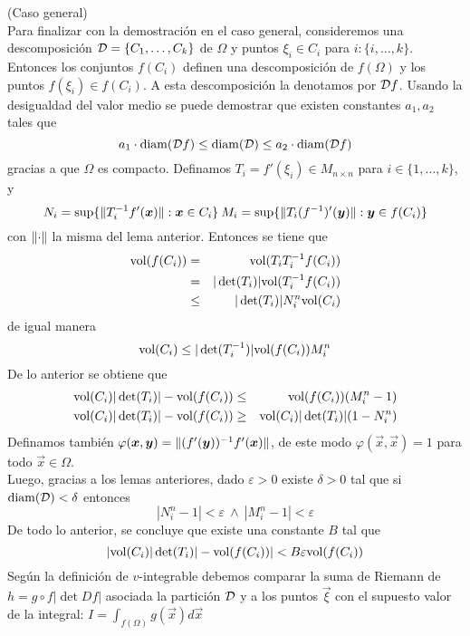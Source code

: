 \begin{demostracion} \hspace{2mm} (Caso general)
\\Para finalizar con la demostraci\'on en el caso general,
consideremos una descomposici\'on ${\cal D} =\{C_1,\ldots,C_k\}$ de
$\Omega$ y puntos $\xi_i\in C_i$ para $i:\{i,\ldots,k\}$. Entonces los
conjuntos $f(C_i)$ definen una descomposici\'on de $f(\Omega )$ y
los puntos $f(\xi_i)\in f(C_i)$. A esta descomposici\'on la
denotamos por ${\cal D} f$. Usando la desigualdad del valor medio se
puede demostrar que existen constantes $a_1,a_2$ tales que
\[a_1\cdot {\rm diam} ({\cal D} f)\leq {\rm diam} ({\cal D})\leq a_2\cdot {\rm
diam}({\cal D}
f)\] gracias a que $\Omega$ es compacto. Definamos
$T_i=f'(\xi_i)\in M_{n\times n}$ para $i\in\{1,\ldots,k\}$, y
\[N_i=\sup\{\lVert T_i^{-1}f'(\boldsymbol{x})\rVert : \boldsymbol{x}\in C_i\}\: M_i=\sup\{\lVert T_i(f^{-1})'(\boldsymbol{y})\rVert : \boldsymbol{y}\in f(C_i)\}\]
con $\lVert\cdot\rVert$ la misma del lema anterior. Entonces se tiene
que
\begin{eqnarray*}
{\rm vol}(f(C_i)) &=& {\rm vol}(T_i T_i^{-1}f(C_i))\\ &=& |\det
(T_i)|{\rm vol} (T_i^{-1}f(C_i))\\ &\leq & |\det (T_i)|N_i^n {\rm
vol} (C_i)
\end{eqnarray*}
de igual manera
\[{\rm vol} (C_i)\leq |\det (T_i^{-1})|{\rm vol} (f(C_i))M_i^n\]
De lo anterior se obtiene que
\begin{eqnarray*}
{\rm vol}(C_i)|\det(T_i)|-{\rm vol}(f(C_i)) &\leq& {\rm
vol}(f(C_i))(M_i^n-1)\\ {\rm vol}(C_i)|\det(T_i)|-{\rm
vol}(f(C_i))&\geq& {\rm vol}(C_i)|\det(T_i)|(1-N_i^n)
\end{eqnarray*}
Definamos tambi\'en $\varphi(\boldsymbol{x},\boldsymbol{y})=\lVert(f'(\boldsymbol{y}))^{-1}f'(\boldsymbol{x})\rVert$, de
este modo $\varphi(\vec{x},\vec{x})=1$ para todo $\vec{x}\in \Omega$.\\ Luego,
gracias a los lemas anteriores, dado $\varepsilon
>0$ existe $\delta >0$ tal que si ${\rm diam}({\cal D})<\delta$
entonces
\[|N_i^n-1|<\varepsilon\:\wedge\:|M_i^n-1|<\varepsilon\]
De todo lo anterior, se concluye que existe una constante $B$ tal
que
\[|{\rm vol}(C_i)|\det (T_i)|-{\rm vol}(f(C_i))|<B\varepsilon {\rm vol}(f(C_i))\]
Seg\'un la definici\'on de $v$-integrable debemos comparar la suma
de Riemann de $h=g\circ f|\det Df|$ asociada la partici\'on
${\cal D}$ y a los puntos $\vec{\xi}$ con el supuesto valor de la integral:
$I=\int_{f(\Omega)}g(\vec{x})d\vec{x}$
\begin{eqnarray*}

\end{eqnarray*}
\end{demostracion}
